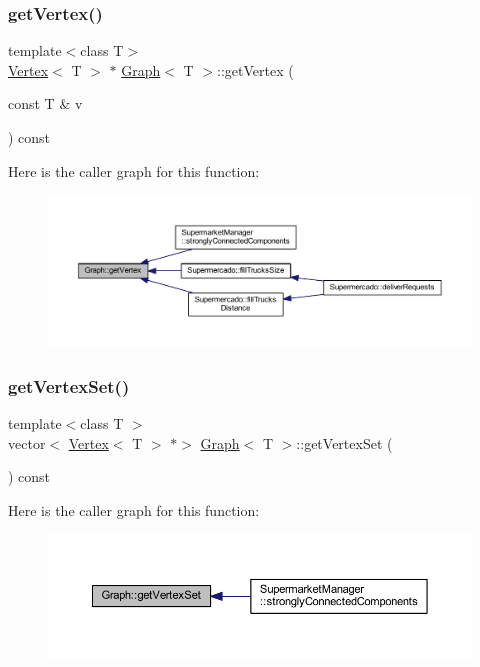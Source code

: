 \subsubsection{\texorpdfstring{get\+Vertex()}{getVertex()}}
{\footnotesize\ttfamily template$<$class T$>$ \\
\hyperlink{class_vertex}{Vertex}$<$ T $>$ $\ast$ \hyperlink{class_graph}{Graph}$<$ T $>$\+::get\+Vertex (\begin{DoxyParamCaption}\item[{const T \&}]{v }\end{DoxyParamCaption}) const}

Here is the caller graph for this function\+:
\nopagebreak
\begin{figure}[H]
\begin{center}
\leavevmode
\includegraphics[width=350pt]{class_graph_a67453d232f04e85c642b51554df1bc6a_icgraph}
\end{center}
\end{figure}
\mbox{\label{class_graph_a135e8f915af85904abca9eafaa4f13ce}} 
\subsubsection{\texorpdfstring{get\+Vertex\+Set()}{getVertexSet()}}
{\footnotesize\ttfamily template$<$class T $>$ \\
vector$<$ \hyperlink{class_vertex}{Vertex}$<$ T $>$ $\ast$$>$ \hyperlink{class_graph}{Graph}$<$ T $>$\+::get\+Vertex\+Set (\begin{DoxyParamCaption}{ }\end{DoxyParamCaption}) const}

Here is the caller graph for this function\+:
\nopagebreak
\begin{figure}[H]
\begin{center}
\leavevmode
\includegraphics[width=350pt]{class_graph_a135e8f915af85904abca9eafaa4f13ce_icgraph}
\end{center}
\end{figure}
\mbox{\label{class_graph_ab49d07c2bd6b8b30d5ae82bc558b821a}} 
